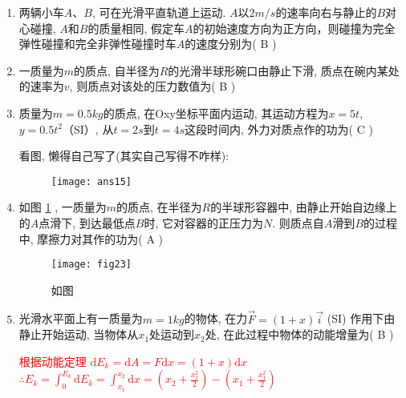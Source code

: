 \begin{enumerate}
\begin{note}
   \end{note}
   \item  两辆小车$A$、$B$, 可在光滑平直轨道上运动. $A$以$2 m/s$的速率向右与静止的$B$对心碰撞, $A$和$B$的质量相同, 假定车$A$的初始速度方向为正方向，则碰撞为完全弹性碰撞和完全非弹性碰撞时车$A$的速度分别为( B )                         
    \item 一质量为$m$的质点, 自半径为$R$的光滑半球形碗口由静止下滑, 质点在碗内某处的速率为$v$, 则质点对该处的压力数值为( B )                
    \item 质量为$m=0.5kg$的质点, 在Oxy坐标平面内运动, 其运动方程为$x=5t$, $y=0.5t^2$（SI）, 从$t=2s$到$t=4s$这段时间内, 外力对质点作的功为( C )
    \begin{note}
        看图, 懒得自己写了(其实自己写得不咋样):
    \end{note}
    \begin{figure}[H]
        \centering
        \texttt{[image: ans15]}
    \end{figure}
    \item 如图 \ref{Fig:23} , 一质量为$m$的质点, 在半径为$R$的半球形容器中, 由静止开始自边缘上的$A$点滑下, 到达最低点$B$时, 它对容器的正压力为$N$. 则质点自$A$滑到$B$的过程中, 摩擦力对其作的功为( A )
    \begin{figure}[H]
        \centering
        \texttt{[image: fig23]}
            \caption{如图}\label{Fig:23}
    \end{figure}
    \item 光滑水平面上有一质量为$m=1kg$的物体, 在力$\vec{F} = (1+x)\vec{i}$  (SI) 作用下由静止开始运动, 当物体从$x_1$处运动到$x_2$处, 在此过程中物体的动能增量为( B )
    \begin{note}
        \textcolor{red}{ 根据动能定理 $\mathrm{d}E_k = \mathrm{d}A = F\mathrm{d}x = (1+x)\mathrm{d}x$\ \ \\
        $\therefore E_k = \displaystyle{\int_0^{E_k}\mathrm{d}E_k=\int_{x_1}^{x_2}\mathrm{d}x = \left(x_2+\frac{x_2^2}{2}\right)-\left(x_1+\frac{x_1^2}{2}\right)}$}

\end{note}
\end{enumerate}
